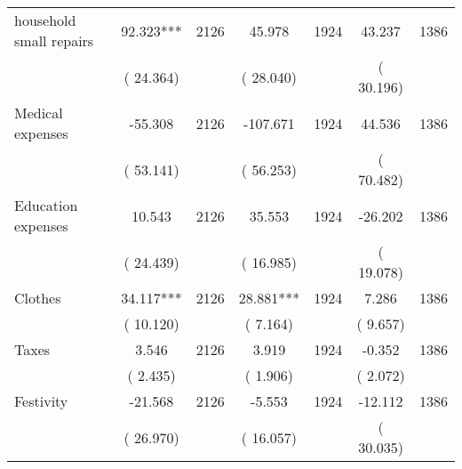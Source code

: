 \begin{tabular}{l*{6}{c}}
household small repairs        &             92.323***      &       2126       &             45.978      &       1924       &             43.237      &       1386       \\
                       &       (      24.364)            &                               &       (      28.040)            &                               &       (      30.196)            &                               \\
Medical expenses        &            -55.308      &       2126       &           -107.671      &       1924       &             44.536      &       1386       \\
                       &       (      53.141)            &                               &       (      56.253)            &                               &       (      70.482)            &                               \\
Education expenses        &             10.543      &       2126       &             35.553      &       1924       &            -26.202      &       1386       \\
                       &       (      24.439)            &                               &       (      16.985)            &                               &       (      19.078)            &                               \\
Clothes        &             34.117***      &       2126       &             28.881***      &       1924       &              7.286      &       1386       \\
                       &       (      10.120)            &                               &       (       7.164)            &                               &       (       9.657)            &                               \\
Taxes        &              3.546      &       2126       &              3.919      &       1924       &             -0.352      &       1386       \\
                       &       (       2.435)            &                               &       (       1.906)            &                               &       (       2.072)            &                               \\
Festivity        &            -21.568      &       2126       &             -5.553      &       1924       &            -12.112      &       1386       \\
                       &       (      26.970)            &                               &       (      16.057)            &                               &       (      30.035)            &                               \\
\hline \end{tabular}